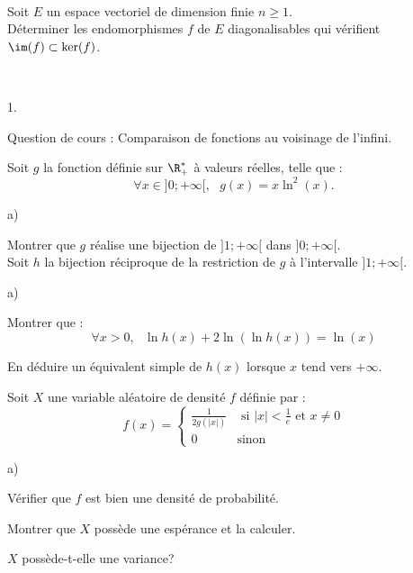 \documentclass[11pt]{article}%
\begin{document}
\begin{exerciceSP}~\\
  Soit $E$ un espace vectoriel de dimension finie $n \geq 1$. \\
  Déterminer les endomorphismes $f$ de $E$ diagonalisables qui
  vérifient $\im(f) \subset \ker(f)$.
\end{exerciceSP}


\newpage


\begin{exerciceAP}~
  \begin{noliste}{1.}
    \setlength{\itemsep}{2mm}
  \item Question de cours : Comparaison de fonctions au voisinage de l'infini.
  \item Soit $g$ la fonction définie sur $\R_+^*$ à valeurs réelles, telle que :
    \[
    \forall x \in ] 0 ; +\infty[,\ \ \ g(x) = x \ln^2 (x).
    \]
    \begin{noliste}{a)}
    \setlength{\itemsep}{2mm} 
    \item Montrer que $g$ réalise une bijection de $] 1 ; +\infty[$
      dans $] 0 ; +\infty[$. \\
      Soit $h$ la bijection réciproque de la restriction de $g$ à
      l'intervalle $]1 ; +\infty[$.
    \item
      \begin{noliste}{a)}
    \setlength{\itemsep}{2mm}
      \item Montrer que :
        \[
        \forall x > 0,\ \ \ \ln h(x) + 2 \ln ( \ln h(x) ) = \ln (x)
        \]
      \item En déduire un équivalent simple de $h(x)$ lorsque $x$ tend
        vers $+\infty$.
      \end{noliste}
    \end{noliste}
  \item Soit $X$ une variable aléatoire de densité $f$ définie par :
    \[
    f(x) = \left\{ 
      \begin{array}{ll} 
        \frac{1}{2 g (\vert x \vert)} & \text{ si } \vert x \vert <
        \frac{1}{e} \text{ et } x \neq 0 \\ 
        0 & \text{sinon} 
      \end{array} \right.
    \]
    \begin{noliste}{a)}
    \setlength{\itemsep}{2mm}
    \item Vérifier que $f$ est bien une densité de probabilité.
    \item Montrer que $X$ possède une espérance et la calculer.
    \item $X$ possède-t-elle une variance? \\
    \end{noliste}
  \end{noliste}
\end{exerciceAP}
\end{document}
